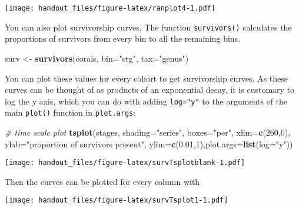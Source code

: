 \documentclass[]{article}
\newenvironment{Shaded}{\begin{snugshade}}{\end{snugshade}}
\newcommand{\KeywordTok}[1]{\textcolor[rgb]{0.13,0.29,0.53}{\textbf{{#1}}}}
\newcommand{\DataTypeTok}[1]{\textcolor[rgb]{0.13,0.29,0.53}{{#1}}}
\newcommand{\DecValTok}[1]{\textcolor[rgb]{0.00,0.00,0.81}{{#1}}}
\newcommand{\FloatTok}[1]{\textcolor[rgb]{0.00,0.00,0.81}{{#1}}}
\newcommand{\StringTok}[1]{\textcolor[rgb]{0.31,0.60,0.02}{{#1}}}
\newcommand{\CommentTok}[1]{\textcolor[rgb]{0.56,0.35,0.01}{\textit{{#1}}}}
\newcommand{\NormalTok}[1]{{#1}}
\begin{document}
\texttt{[image: handout\_files/figure-latex/ranplot4-1.pdf]}

You can also plot survivorship curves. The function \texttt{survivors()}
calculates the proportions of survivors from every bin to all the
remaining bins.

\begin{Shaded}
\begin{Highlighting}[]
\NormalTok{surv <-}\StringTok{ }\KeywordTok{survivors}\NormalTok{(corals, }\DataTypeTok{bin=}\StringTok{"stg"}\NormalTok{, }\DataTypeTok{tax=}\StringTok{"genus"}\NormalTok{)}
\end{Highlighting}
\end{Shaded}

You can plot these values for every cohort to get survivorship curves.
As these curves can be thought of as products of an exponential decay,
it is customary to log the y axis, which you can do with adding
\texttt{log="y"} to the arguments of the main \texttt{plot()} function
in \texttt{plot.args}:

\begin{Shaded}
\begin{Highlighting}[]
\CommentTok{# time scale plot}
\KeywordTok{tsplot}\NormalTok{(stages, }\DataTypeTok{shading=}\StringTok{"series"}\NormalTok{, }\DataTypeTok{boxes=}\StringTok{"per"}\NormalTok{, }
  \DataTypeTok{xlim=}\KeywordTok{c}\NormalTok{(}\DecValTok{260}\NormalTok{,}\DecValTok{0}\NormalTok{), }\DataTypeTok{ylab=}\StringTok{"proportion of survivors present"}\NormalTok{,}
  \DataTypeTok{ylim=}\KeywordTok{c}\NormalTok{(}\FloatTok{0.01}\NormalTok{,}\DecValTok{1}\NormalTok{),}\DataTypeTok{plot.args=}\KeywordTok{list}\NormalTok{(}\DataTypeTok{log=}\StringTok{"y"}\NormalTok{))}
\end{Highlighting}
\end{Shaded}

\texttt{[image: handout\_files/figure-latex/survTsplotblank-1.pdf]}

Then the curves can be plotted for every column with

\begin{Shaded}
\end{Shaded}

\texttt{[image: handout\_files/figure-latex/survTsplot1-1.pdf]}
\end{document}
